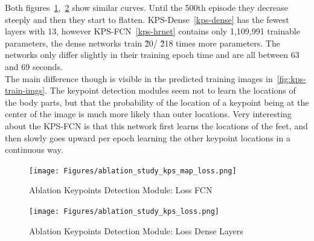 Both figures~\ref{fig:kps-map-loss},~\ref{fig:kps-loss} show similar curves.
Until the 500th episode they decrease steeply and then they start to flatten.
KPS-Dense~\ref{kps-dense} has the fewest layers with 13, however KPS-FCN~\ref{kps-hrnet} contains only 1,109,991
trainable parameters, the dense networks train \~20/ \~218 times more parameters.
The networks only differ slightly in their training epoch time and are all between 63 and 69 seconds.\\
The main difference though is visible in the predicted training images in~\ref{fig:kps-train-imgs}.
The keypoint detection modules seem not to learn the locations of the body parts, but that the probability of the location
of a keypoint being at the center of the image is much more likely than outer locations.
Very interesting about the KPS-FCN is that this network first learns the locations of the feet, and then slowly goes
upward per epoch learning the other keypoint locations in a continuous way.


\begin{figure}[H]
    \centering
    \texttt{[image: Figures/ablation\_study\_kps\_map\_loss.png]}
    \decoRule
    \caption[Ablation Keypoints Detection Module: Loss FCN]{Ablation Keypoints Detection Module: Loss FCN}
    \label{fig:kps-map-loss}
\end{figure}


\begin{figure}[H]
    \centering
    \texttt{[image: Figures/ablation\_study\_kps\_loss.png]}
    \decoRule
    \caption[Ablation Keypoints Detection Module: Loss Dense Layers]{Ablation Keypoints Detection Module: Loss Dense Layers}
    \label{fig:kps-loss}
\end{figure}

